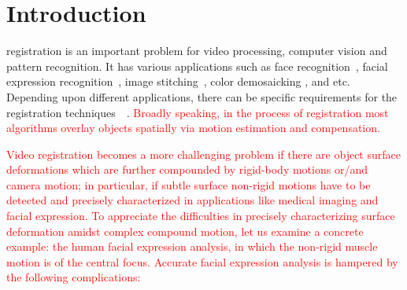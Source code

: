 \documentclass[10pt,journal]{IEEEtran}
\newcommand{\Songfan}[1]{\textcolor{red}{#1}}
\begin{document}
\maketitle


\IEEEdisplaynotcompsoctitleabstractindextext


%
\IEEEpeerreviewmaketitle


\section{Introduction}

 registration is an important problem for video processing, computer vision and pattern recognition. It has various applications such as face recognition~\cite{Wagner2009}, facial expression recognition~\cite{Valstar12}, image stitching~\cite{Szeliski06}, color demosaicking \cite{Wu_TIP06}, and etc. Depending upon different applications, there can be specific requirements for the registration techniques~\cite{Uenohara95}~\cite{Caspi_PAMI02}. \Songfan{Broadly speaking, in the process of registration most algorithms overlay objects spatially via motion estimation and compensation. 
}

\Songfan{Video registration becomes a more challenging problem if there are object surface deformations which are further compounded by rigid-body motions or/and camera motion; in particular, if subtle surface non-rigid motions have to be detected and precisely characterized in applications like medical imaging and facial expression. To appreciate the difficulties in precisely characterizing surface deformation amidst complex compound motion, let us examine a concrete example: the human facial expression analysis, in which the non-rigid muscle motion is of the central focus.  Accurate facial expression analysis is hampered by the following complications:} 
\end{document}
